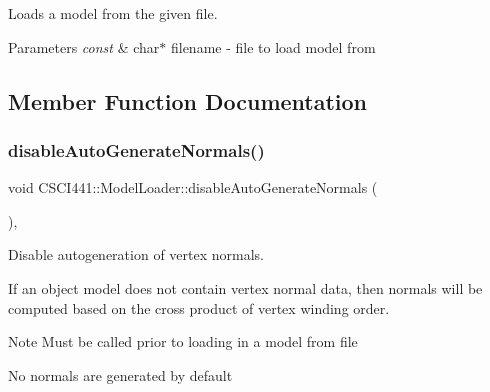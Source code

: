 Loads a model from the given file. 


\begin{DoxyParams}{Parameters}
{\em const} & char$\ast$ filename -\/ file to load model from \\
\hline
\end{DoxyParams}


\subsection{Member Function Documentation}
\mbox{\label{class_c_s_c_i441_1_1_model_loader_aaf1ec38a0f551569ccf1a47af2a561f3}} 
\subsubsection{\texorpdfstring{disable\+Auto\+Generate\+Normals()}{disableAutoGenerateNormals()}}
{\footnotesize\ttfamily void C\+S\+C\+I441\+::\+Model\+Loader\+::disable\+Auto\+Generate\+Normals (\begin{DoxyParamCaption}{ }\end{DoxyParamCaption})\hspace{0.3cm}{\ttfamily [inline]}, {\ttfamily [static]}}



Disable autogeneration of vertex normals. 

If an object model does not contain vertex normal data, then normals will be computed based on the cross product of vertex winding order.

\begin{DoxyNote}{Note}
Must be called prior to loading in a model from file 

No normals are generated by default 
\end{DoxyNote}
\mbox{\label{class_c_s_c_i441_1_1_model_loader_a46734dcf7845e240a1ca9a31d6e5a468}} 
